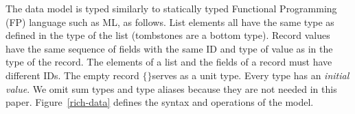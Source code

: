\documentclass[english,submission]{programming}
\theoremstyle{definition}
\newcommand{\mathbox}[1]{\colorbox{black!10}{$#1$\phantom{i\hspace{-3.5pt}}}}
\newcommand{\is}{{:}\ }
\newcommand{\emptystring}{\textsf{\textquotedbl\ \!\textquotedbl}}
\providecommand{\DIFdelbeginFL}{} %
\begin{document}
The data model is typed similarly to statically typed Functional Programming (FP) language such as ML, as follows. List elements all have the same type as defined in the type of the list (tombstones are a bottom type). Record values have the same sequence of fields with the same ID and type of value as in the type of the record. The elements of a list and the fields of a record must have different IDs.
The empty record \mathbox{\text{\{\}}}serves as a unit type. Every type has an \textit{initial value}.
We omit sum types and type aliases because they are not needed in this paper.
Figure~\ref{rich-data} defines the syntax and operations of the model.

\begin{figure}[h]
  \DIFdelbeginFL %




\end{figure}
\end{document}
